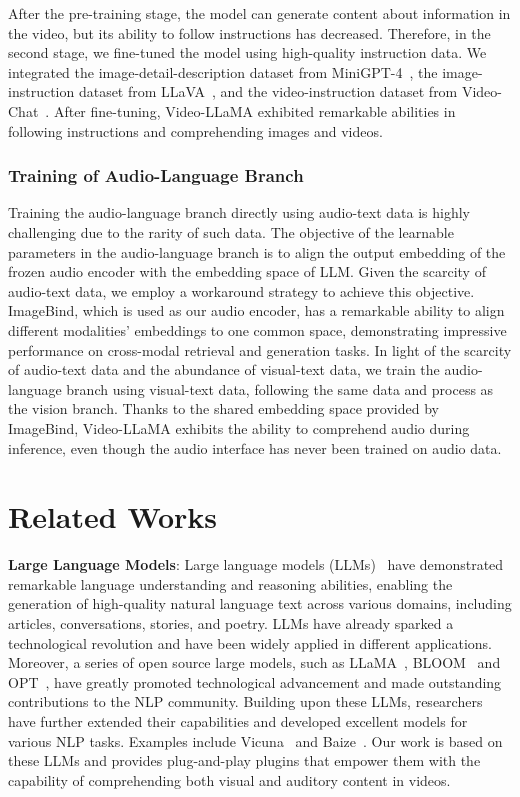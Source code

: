 \documentclass[11pt]{article}
\begin{document}
After the  pre-training stage, the model can generate content about information in the video, but its ability to follow instructions has decreased. Therefore, in the second stage, we fine-tuned the model using high-quality instruction data. We integrated the image-detail-description dataset from MiniGPT-4~\citep{zhu2023minigpt}, the image-instruction dataset from LLaVA~\citep{liu2023visualit}, and the video-instruction dataset from Video-Chat~\citep{li2023videochatcv}. After fine-tuning, Video-LLaMA exhibited remarkable abilities in following instructions and comprehending images and videos. 

\subsubsection{Training of Audio-Language Branch}
Training the audio-language branch directly using audio-text data is highly challenging due to the rarity of such data.  The objective of the learnable parameters in the audio-language branch is to align the output embedding of the frozen audio encoder with the embedding space of LLM. Given the scarcity of audio-text data, we employ a workaround strategy to achieve this objective.
ImageBind, which is used as our audio encoder, has a remarkable ability to align different modalities' embeddings to one common space, demonstrating impressive performance on cross-modal retrieval and generation tasks. 
In light of the scarcity of audio-text data and the abundance of visual-text data, we train the audio-language branch using visual-text data, following the same data and process as the vision branch.  Thanks to the shared embedding space provided by ImageBind, Video-LLaMA exhibits the ability to comprehend audio during inference, even though the audio interface has never been trained on audio data.

\section{Related Works}
\textbf{Large Language Models}: Large language models (LLMs)~\citep{black2022gpt, scao2022bloom, openai2023gpt4tr, tsimpoukelli2021multimodal} have demonstrated remarkable language understanding and reasoning abilities, enabling the generation of high-quality natural language text across various domains, including articles, conversations, stories, and poetry. LLMs have already sparked a technological revolution and have been widely applied in different applications. Moreover, a series of open source large models, such as LLaMA~\citep{touvron2023llama}, BLOOM~\citep{scao2022bloom} and OPT~\citep{zhang2022opt}, have greatly promoted technological advancement and made outstanding contributions to the NLP community. Building upon these LLMs, researchers have further extended their capabilities and developed excellent models for various NLP tasks. Examples include Vicuna~\citep{chiang2023vicuna} and Baize~\citep{xu2023baize}. Our work is based on these LLMs and provides plug-and-play plugins that empower them with the capability of comprehending both visual and auditory content in videos.
\end{document}
